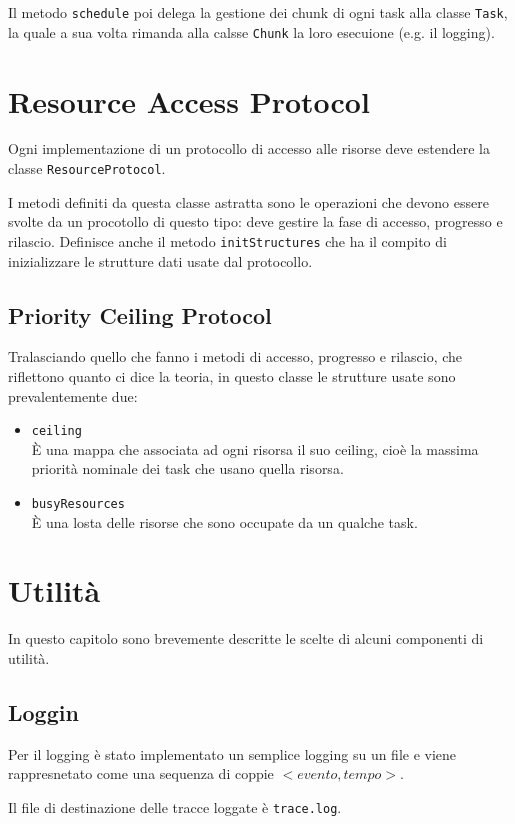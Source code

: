 \myskip

Il metodo \texttt{schedule} poi delega la gestione dei chunk di ogni task alla classe \texttt{Task}, la quale a sua volta rimanda alla calsse \texttt{Chunk} la loro esecuione (e.g. il logging).

\section{Resource Access Protocol}
Ogni implementazione di un protocollo di accesso alle risorse deve estendere la classe \texttt{ResourceProtocol}.

I metodi definiti da questa classe astratta sono le operazioni che devono essere svolte da un procotollo di questo tipo: deve gestire la fase di accesso, progresso e rilascio. Definisce anche il metodo \texttt{initStructures} che ha il compito di inizializzare le strutture dati usate dal protocollo.

\subsection{Priority Ceiling Protocol}
Tralasciando quello che fanno i metodi di accesso, progresso e rilascio, che riflettono quanto ci dice la teoria, in questo classe le strutture usate sono prevalentemente due:
\begin{itemize}
    \item \texttt{ceiling} \\
        È una mappa che associata ad ogni risorsa il suo ceiling, cioè la massima priorità nominale dei task che usano quella risorsa.
    \item \texttt{busyResources}\\
        È una losta delle risorse che sono occupate da un qualche task.
\end{itemize}

\section{Utilità}
In questo capitolo sono brevemente descritte le scelte di alcuni componenti di utilità.

\subsection{Loggin}
Per il logging è stato implementato un semplice logging su un file e viene rappresnetato come una sequenza di coppie $<evento,tempo>$.

Il file di destinazione delle tracce loggate è \texttt{trace.log}.

